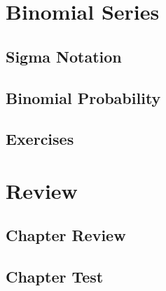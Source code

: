 \newpage
\section{Binomial Series}
\noindent{}
\subsection{Sigma Notation}
\subsection{Binomial Probability}
\subsection{Exercises}

\newpage
\section{Review}
\subsection{Chapter Review}
\subsection{Chapter Test}

